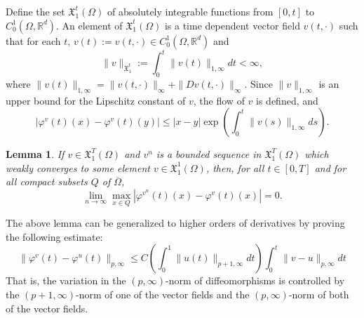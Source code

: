 \documentclass[a5paper,10pt,twoside]{article}
\newcommand{\R}{\ensuremath{\mathbb{R}}}
\newcommand{\X}{\ensuremath{\mathfrak{X}}}
\theoremstyle{plain}
\newtheorem{lem}[teo]{Lemma}
\theoremstyle{definition}
\theoremstyle{remark}
\begin{document}
Define the set $\X_1^t(\Omega)$ of absolutely integrable functions from $[0,t]$ to $C_0^1(\Omega,\R^d)$. An element of $\X_1^t(\Omega)$ is a time dependent vector field $v(t,\cdot)$ such that for each $t$, $v(t):=v(t,\cdot)\in C_0^1(\Omega,\R^d)$ and
\[
\|v\|_{\X_1^t}:=\int_0^t\|v(t)\|_{1,\infty}dt<\infty,
\]
where $\|v(t)\|_{1,\infty}=\|v(t,\cdot)\|_\infty+\|Dv(t,\cdot)\|_\infty$. Since $\|v\|_{1,\infty}$ is an upper bound for the Lipschitz constant of $v$, the flow of $v$ is defined, and
%
\begin{equation}
|\varphi^v(t)(x)-\varphi^v(t)(y)|\leq |x-y|\exp\left(\int_0^t\|v(s)\|_{1,\infty}ds\right).
\end{equation}

\begin{lem}\label{pointwise}
	If $v\in\X_1^T(\Omega)$ and $v^n$ is a bounded sequence in $\X_1^T(\Omega)$ which weakly converges to some element $v\in\X_1^1(\Omega)$, then, for all $t\in[0,T]$ and for all compact subsets $Q$ of $\overline{\Omega}$,
	\[
	\lim_{n\to\infty}\max_{x\in Q}\left|\varphi^{v^n}(t)(x)-\varphi^{v}(t)(x)\right|=0.
	\]
\end{lem}
The above lemma can be generalized to higher orders of derivatives by proving the following estimate:
%
\begin{equation} 
\label{eq:estimate}
\|\varphi^v(t)-\varphi^{u}(t)\|_{p,\infty}\leq C\left(\int_0^1\|u(t)\|_{p+1,\infty}dt\right)\int_0^t\|v-u\|_{p,\infty} dt
\end{equation}
%
That is, the variation in the $(p,\infty)$-norm of diffeomorphisms is controlled by the $(p+1,\infty)$-norm of one of the vector fields and the $(p,\infty)$-norm of both of the vector fields.
\end{document}

